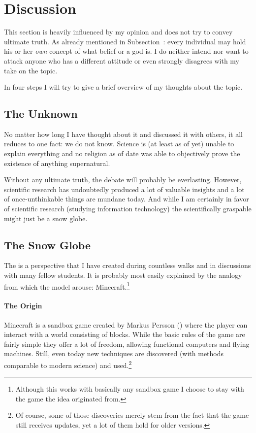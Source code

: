 \section{Discussion}
\label{sec:Discussion}This section is heavily influenced by my opinion and does not try to convey  ultimate truth. As already mentioned in Subsection~\nohyper{\ref{subsec:religious-views}}: every individual may hold his or her \emph{own} concept of what belief or a god is. I do neither intend nor want to attack anyone who has a different attitude or even strongly disagrees with my take on the topic.

In four steps I will try to give a brief overview of my thoughts about the topic.

\subsection{The Unknown}\label{subsec:the-unknown}
No matter how long I have thought about it and discussed it with others, it all reduces to one fact: we do not know. Science is (at least as of yet) unable to explain everything and no religion as of date was able to objectively prove the existence of anything supernatural.

Without any ultimate truth, the debate will probably be everlasting. However, scientific research has undoubtedly produced a lot of valuable insights and a lot of once-unthinkable things are mundane today.
And while I am certainly in favor of scientific research (studying information technology) the scientifically graspable might just be a snow globe.

\subsection{The Snow Globe}\label{subsec:snow-globe}
The  is a perspective that I have created during countless walks and in discussions with many fellow students.
It is probably most easily explained by the analogy from which the model arouse: Minecraft.\footnote{Although this works with basically any sandbox game I choose to stay with the game the idea originated from.}

\paragraph{The Origin} Minecraft is a sandbox game created by Markus Persson () where the player can interact with a world consisting of blocks. While the basic rules of the game are fairly simple they offer a lot of freedom, allowing functional computers and flying machines. Still, even today new techniques are discovered (with methods comparable to modern science) and used.\footnote{Of course, some of those discoveries merely stem from the fact that the game still receives updates, yet a lot of them hold for older versions.}

